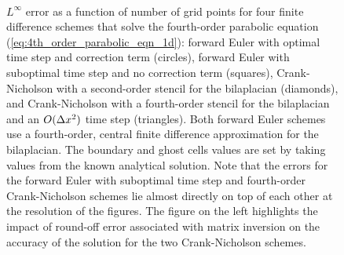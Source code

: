 \documentclass[fleqn,12pt,twoside]{article}
\begin{document}
\begin{figure}[tb]
\begin{center}
\ \ 
\caption{$L^\infty$ error as a function of number of grid points for four
finite difference schemes that solve the fourth-order parabolic equation
(\ref{eq:4th_order_parabolic_eqn_1d}):
forward Euler with optimal time step and correction term (circles),
forward Euler with suboptimal time step and no correction term (squares),
Crank-Nicholson with a second-order stencil for the bilaplacian (diamonds), 
and Crank-Nicholson with a fourth-order stencil for the bilaplacian and
an $O(\Delta x^2)$ time step (triangles).
Both forward Euler schemes use a fourth-order, central finite difference 
approximation for the bilaplacian.  The boundary and ghost cells values
are set by taking values from the known analytical solution.
Note that the errors for the forward Euler with suboptimal time step and 
fourth-order Crank-Nicholson schemes lie almost directly on top of each 
other at the resolution of the figures.  
The figure on the left highlights the impact of round-off error associated 
with matrix inversion on the accuracy of the solution for the two 
Crank-Nicholson schemes.
}
\label{fig:4th_order_parabolic_eqn_1d_error}
\end{center}
\end{figure}
\end{document}
